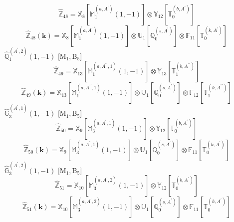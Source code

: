 \documentclass[fleqn,10pt,landscape]{article}
\begin{document}
\begin{itemize}
\begin{dmath*}
\hat{\mathbb{Z}}_{48}=\mathbb{X}_{8}[\mathbb{M}_{1}^{(a,A^{\prime})}(1,-1)] \otimes\mathbb{Y}_{12}[\mathbb{T}_{0}^{(b,A^{\prime})}]
\end{dmath*}
\begin{dmath*}
\hat{\mathbb{Z}}_{48}(\bm{k})=\mathbb{X}_{8}[\mathbb{M}_{1}^{(a,A^{\prime})}(1,-1)] \otimes\mathbb{U}_{1}[\mathbb{Q}_{0}^{(s,A^{\prime})}] \otimes\mathbb{F}_{11}[\mathbb{T}_{0}^{(k,A^{\prime})}]
\end{dmath*}
\vspace{4mm}
\noindent {} $\,\,\,\hat{\mathbb{Q}}_{1}^{(A^{\prime},2)}(1,-1)$ [M$_{1}$,\,B$_{5}$]
\begin{dmath*}
\hat{\mathbb{Z}}_{49}=\mathbb{X}_{13}[\mathbb{M}_{1}^{(a,A^{\prime\prime},1)}(1,-1)] \otimes\mathbb{Y}_{13}[\mathbb{T}_{1}^{(b,A^{\prime\prime})}]
\end{dmath*}
\begin{dmath*}
\hat{\mathbb{Z}}_{49}(\bm{k})=\mathbb{X}_{13}[\mathbb{M}_{1}^{(a,A^{\prime\prime},1)}(1,-1)] \otimes\mathbb{U}_{1}[\mathbb{Q}_{0}^{(s,A^{\prime})}] \otimes\mathbb{F}_{12}[\mathbb{T}_{1}^{(k,A^{\prime\prime})}]
\end{dmath*}
\vspace{4mm}
\noindent {} $\,\,\,\hat{\mathbb{G}}_{3}^{(A^{\prime},1)}(1,-1)$ [M$_{1}$,\,B$_{5}$]
\begin{dmath*}
\hat{\mathbb{Z}}_{50}=\mathbb{X}_{9}[\mathbb{M}_{3}^{(a,A^{\prime},1)}(1,-1)] \otimes\mathbb{Y}_{12}[\mathbb{T}_{0}^{(b,A^{\prime})}]
\end{dmath*}
\begin{dmath*}
\hat{\mathbb{Z}}_{50}(\bm{k})=\mathbb{X}_{9}[\mathbb{M}_{3}^{(a,A^{\prime},1)}(1,-1)] \otimes\mathbb{U}_{1}[\mathbb{Q}_{0}^{(s,A^{\prime})}] \otimes\mathbb{F}_{11}[\mathbb{T}_{0}^{(k,A^{\prime})}]
\end{dmath*}
\vspace{4mm}
\noindent {} $\,\,\,\hat{\mathbb{G}}_{3}^{(A^{\prime},2)}(1,-1)$ [M$_{1}$,\,B$_{5}$]
\begin{dmath*}
\hat{\mathbb{Z}}_{51}=\mathbb{X}_{10}[\mathbb{M}_{3}^{(a,A^{\prime},2)}(1,-1)] \otimes\mathbb{Y}_{12}[\mathbb{T}_{0}^{(b,A^{\prime})}]
\end{dmath*}
\begin{dmath*}
\hat{\mathbb{Z}}_{51}(\bm{k})=\mathbb{X}_{10}[\mathbb{M}_{3}^{(a,A^{\prime},2)}(1,-1)] \otimes\mathbb{U}_{1}[\mathbb{Q}_{0}^{(s,A^{\prime})}] \otimes\mathbb{F}_{11}[\mathbb{T}_{0}^{(k,A^{\prime})}]
\end{dmath*}

\end{itemize}
\end{document}

